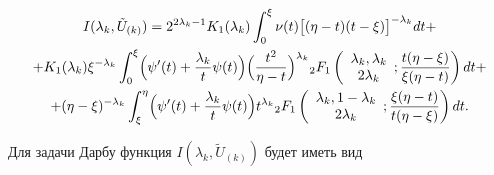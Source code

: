 \begin{multline*}

 I(\lambda_k,\tilde{U}_{(k)}) =2^{2\lambda_k-1}K_1(\lambda_k)  \int _0^{\xi}\nu(t) 

 \bigl[(\eta-t)(t-\xi)\bigr]^{-\lambda_k}dt + \\

+K_1(\lambda_k) \xi^{-\lambda_k}  \int _{0}^{\xi}

\Bigl( \psi'(t)+\frac{\lambda_k}{t} \psi(t)\Bigr) \Bigl( \frac{t^2}{\eta-t} \Bigr) ^{\lambda_k}

{}_2 F_1 \left(

\begin{array}{c}

 \lambda_k, \lambda_k\\

2 \lambda_k

\end{array};

\frac{t(\eta-\xi)}{\xi(\eta-t)}

\right)

dt+\\

+(\eta-\xi)^{-\lambda_k}  \int _{\xi}^{\eta}

\Bigl( \psi'(t)+\frac{\lambda_k}{t} \psi(t)\Bigr)  t^{\lambda_k}

{}_2 F_1 \left(

\begin{array}{c}

 \lambda_k, 1-\lambda_k\\

2 \lambda_k

\end{array};

\frac{\xi(\eta-t)}{t(\eta-\xi)}

\right)dt.

\end{multline*}



Для задачи Дарбу функция $I(\lambda_k,\tilde{U}_{(k)})$ будет иметь вид

